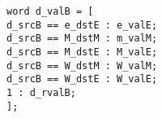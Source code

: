 \documentclass{article}
\begin{document}
\texttt{word d\_valB = [ \\
\hspace*{17mm} d\_srcB == e\_dstE : e\_valE; \\
\hspace*{17mm} d\_srcB == M\_dstM : m\_valM; \\
\hspace*{17mm} d\_srcB == M\_dstE : M\_valE; \\
\hspace*{17mm} d\_srcB == W\_dstM : W\_valM; \\
\hspace*{17mm} d\_srcB == W\_dstE : W\_valE; \\
\hspace*{17mm} 1 : d\_rvalB; \\
\hspace*{5mm}];}
\end{document}
